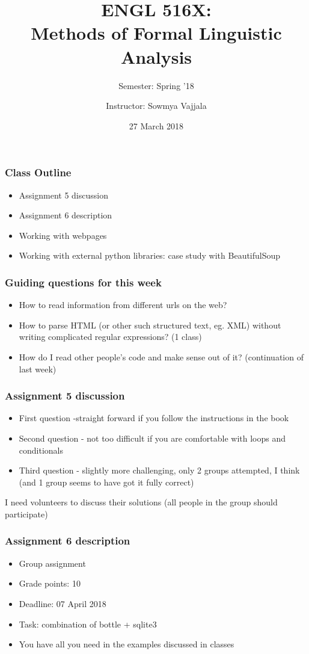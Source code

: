 \documentclass{beamer}
\author[Sowmya Vajjala]{Instructor: Sowmya Vajjala}
\title[ENGL 516X]{ENGL 516X: \\ Methods of Formal Linguistic Analysis}
\subtitle{Semester: Spring '18}
\date{27 March 2018}
\institute{Iowa State University, USA}
\begin{document}
\begin{frame}\titlepage
\end{frame}

\begin{frame}
\frametitle{Class Outline}
\begin{itemize}
\item Assignment 5 discussion
\item Assignment 6 description
\item Working with webpages
\item Working with external python libraries: case study with BeautifulSoup
\end{itemize}
\end{frame}

\begin{frame}
\frametitle{Guiding questions for this week}
\begin{itemize}
\item How to read information from different urls on the web?
\item How to parse HTML (or other such structured text, eg. XML) without writing complicated regular expressions? (1 class)
\item How do I read other people's code and make sense out of it? (continuation of last week)
\end{itemize}
\end{frame}

\begin{frame}
\frametitle{Assignment 5 discussion}
\begin{itemize}
\item First question -straight forward if you follow the instructions in the book
\item Second question - not too difficult if you are comfortable with loops and conditionals
\item Third question - slightly more challenging, only 2 groups attempted, I think (and 1 group seems to have got it fully correct)
\end{itemize}
I need volunteers to discuss their solutions (all people in the group should participate)
\end{frame}

\begin{frame}
\frametitle{Assignment 6 description}
\begin{itemize}
\item Group assignment
\item Grade points: 10
\item Deadline: 07 April 2018
\item Task: combination of bottle + sqlite3
\item You have all you need in the examples discussed in classes
\end{itemize}
\end{frame}
\end{document}
